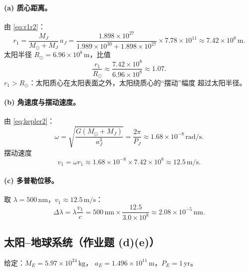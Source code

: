 \documentclass[UTF8,a4paper,11pt]{ctexart}
\begin{document}
\paragraph{(a) 质心距离。}
由 \eqref{eq:r1r2}：
\begin{equation}
  r_1=\frac{M_J}{M_\odot+M_J}\,a_J
  =\frac{1.898\times10^{27}}{1.989\times10^{30}+1.898\times10^{27}}\times7.78\times10^{11}
  \approx 7.42\times10^8\,\mathrm m.
\end{equation}
太阳半径 $R_\odot=6.96\times10^8\,\mathrm m$，比值
\begin{equation}
  \frac{r_1}{R_\odot}\approx\frac{7.42\times10^8}{6.96\times10^8}\approx1.07.
\end{equation}
$r_1>R_\odot$：太阳质心在太阳表面之外，太阳绕质心的``摆动''幅度
超过太阳半径。

\paragraph{(b) 角速度与摆动速度。}
由 \eqref{eq:kepler2}：
\begin{equation}
  \omega=\sqrt{\frac{G(M_\odot+M_J)}{a_J^3}}
  =\frac{2\pi}{P_J}\approx1.68\times10^{-8}\,\mathrm{rad/s}.
\end{equation}
摆动速度
\begin{equation}
  v_1=\omega r_1\approx1.68\times10^{-8}\times7.42\times10^8
  \approx 12.5\,\mathrm{m/s}.
\end{equation}

\paragraph{(c) 多普勒位移。}
取 $\lambda=500\,\mathrm{nm}$，$v_1\approx12.5\,\mathrm{m/s}$：
\begin{equation}
  \Delta\lambda=\lambda\frac{v_1}{c}
  =500\,\mathrm{nm}\times\frac{12.5}{3.0\times10^8}
  \approx 2.08\times10^{-5}\,\mathrm{nm}.
\end{equation}

\subsection{太阳--地球系统（作业题 (d)(e)）}
\label{sub:earth}

给定：$M_E=5.97\times10^{24}\,\mathrm{kg}$，
$a_E=1.496\times10^{11}\,\mathrm m$，$P_E=1\,\mathrm{yr}$。
\end{document}
